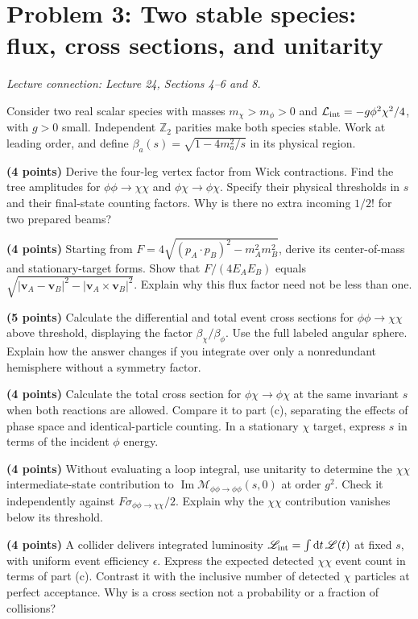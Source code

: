 \documentclass[11pt]{article}
\newcommand{\dd}{\mathrm d}
\newcommand{\Lag}{\mathcal L}
\newcommand{\cM}{\mathcal M}
\newcommand{\problem}[2]{\clearpage\section*{\color{qftblue}Problem #1: #2}}
\newcommand{\connection}[1]{{\small\textit{Lecture connection: #1}\par}\medskip}
\begin{document}
\problem{3}{Two stable species: flux, cross sections, and unitarity}
\connection{Lecture 24, Sections 4--6 and 8.}
Consider two real scalar species with masses \(m_\chi>m_\phi>0\) and
\(\Lag_{\rm int}=-g\phi^2\chi^2/4\), with \(g>0\) small. Independent
\(\mathbb Z_2\) parities make both species stable. Work at leading order,
and define \(\beta_a(s)=\sqrt{1-4m_a^2/s}\) in its physical region.
\begin{parts}
\item \textbf{(4 points)} Derive the four-leg vertex factor from Wick
contractions. Find the tree amplitudes for
\(\phi\phi\to\chi\chi\) and \(\phi\chi\to\phi\chi\).
Specify their physical thresholds in \(s\) and their final-state counting
factors. Why is there no extra incoming \(1/2!\) for two prepared beams?

\item \textbf{(4 points)} Starting from
\(F=4\sqrt{(p_A\cdot p_B)^2-m_A^2m_B^2}\), derive its center-of-mass and
stationary-target forms. Show that \(F/(4E_AE_B)\) equals
\(\sqrt{|\bm v_A-\bm v_B|^2-|\bm v_A\times\bm v_B|^2}\).
Explain why this flux factor need not be less than one.

\item \textbf{(5 points)} Calculate the differential and total event
cross sections for \(\phi\phi\to\chi\chi\) above threshold, displaying
the factor \(\beta_\chi/\beta_\phi\). Use the full labeled angular sphere.
Explain how the answer changes if you integrate over only a nonredundant
hemisphere without a symmetry factor.

\item \textbf{(4 points)} Calculate the total cross section for
\(\phi\chi\to\phi\chi\) at the same invariant \(s\) when both reactions
are allowed. Compare it to part (c), separating the effects of phase space
and identical-particle counting. In a stationary \(\chi\) target, express
\(s\) in terms of the incident \(\phi\) energy.

\item \textbf{(4 points)} Without evaluating a loop integral, use
unitarity to determine the \(\chi\chi\) intermediate-state contribution
to \(\operatorname{Im}\cM_{\phi\phi\to\phi\phi}(s,0)\) at order \(g^2\).
Check it independently against \(F\sigma_{\phi\phi\to\chi\chi}/2\).
Explain why the \(\chi\chi\) contribution vanishes below its threshold.

\item \textbf{(4 points)} A collider delivers integrated luminosity
\(\mathscr L_{\rm int}=\int\dd t\,\mathscr L(t)\) at fixed \(s\), with
uniform event efficiency \(\epsilon\). Express the expected detected
\(\chi\chi\) event count in terms of part (c). Contrast it with the
inclusive number of detected \(\chi\) particles at perfect acceptance.
Why is a cross section not a probability or a fraction of collisions?
\end{parts}
\end{document}
